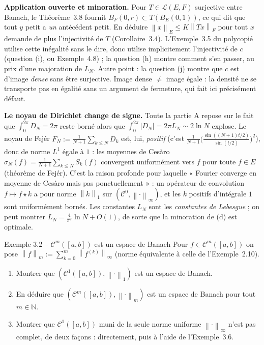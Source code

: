 \documentclass[11pt,a4paper]{article}
\newcommand{\N}{\mathbb{N}}
\newcommand{\norm}[1]{\left\|#1\right\|}
\newcommand{\Lc}{\mathcal{L}}
\newcommand{\Cz}{\mathcal{C}^0}
\theoremstyle{definition}
\begin{document}
\begin{piege}
\textbf{Application ouverte et minoration.} Pour $T\in\Lc(E,F)$ surjective entre Banach, le Théorème~3.8 fournit $B_F(0,r)\subset T(B_E(0,1))$, ce qui dit que tout $y$ petit a \emph{un} antécédent petit. En déduire $\norm x_E\le K\norm{Tx}_F$ pour tout $x$ demande de plus l'injectivité de $T$ (Corollaire~3.4). L'Exemple~3.5 du polycopié utilise cette inégalité sans le dire, donc utilise implicitement l'injectivité de $c$ (question (i), ou Exemple~4.8) ; la question (h) montre comment s'en passer, au prix d'une majoration de $L_N$. Autre point : la question (j) montre que $c$ est d'image \emph{dense} sans être surjective. Image dense $\ne$ image égale : la densité ne se transporte pas en égalité sans un argument de fermeture, qui fait ici précisément défaut.
\end{piege}

\begin{commentaire}
\textbf{Le noyau de Dirichlet change de signe.} Toute la partie A repose sur le fait que $\int_0^{2\pi}D_N=2\pi$ reste borné alors que $\int_0^{2\pi}|D_N|=2\pi L_N\sim2\ln N$ explose. Le noyau de Fejér $F_N:=\frac1{N+1}\sum_{k\le N}D_k$ est, lui, \emph{positif} (c'est $\frac1{N+1}\big(\frac{\sin((N+1)t/2)}{\sin(t/2)}\big)^2$), donc de norme $L^1$ égale à $1$ : les moyennes de Cesàro $\sigma_N(f)=\frac1{N+1}\sum_{k\le N}S_k(f)$ convergent uniformément vers $f$ pour toute $f\in E$ (théorème de Fejér). C'est la raison profonde pour laquelle « Fourier converge en moyenne de Cesàro mais pas ponctuellement » : un opérateur de convolution $f\mapsto f\star k$ a pour norme $\norm k_1$ sur $(\Cz,\norm\cdot_\infty)$, et les $k$ positifs d'intégrale $1$ sont uniformément bornés. Les constantes $L_N$ sont les \emph{constantes de Lebesgue} ; on peut montrer $L_N=\frac4{\pi^2}\ln N+O(1)$, de sorte que la minoration de (d) est optimale.
\end{commentaire}



\begin{exo}{Exemple 3.2 -- $\mathcal C^m([a,b])$ est un espace de Banach}
Pour $f\in\mathcal C^m([a,b])$ on pose $\norm f_{m}:=\sum_{k=0}^m\norm{f^{(k)}}_\infty$ (norme équivalente à celle de l'Exemple~2.10).
\begin{enumerate}[label=(\alph*)]
  \item Montrer que $(\mathcal C^1([a,b]),\norm\cdot_1)$ est un espace de Banach.
  \item En déduire que $(\mathcal C^m([a,b]),\norm\cdot_m)$ est un espace de Banach pour tout $m\in\N$.
  \item Montrer que $\mathcal C^1([a,b])$ muni de la seule norme uniforme $\norm\cdot_\infty$ n'est pas complet, de deux façons : directement, puis à l'aide de l'Exemple~3.6.
\end{enumerate}
\end{exo}
\end{document}
